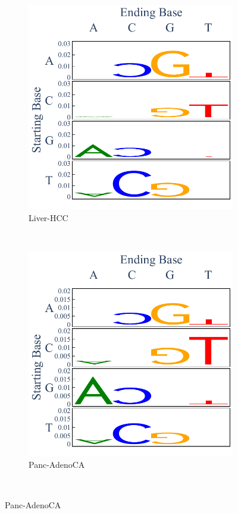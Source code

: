 \begin{figure}[htbp]
    \begin{subfigure}{.5\textwidth}
    \includegraphics[scale=0.7]{graphics/spectra_Liver-HCC.pdf}
    \caption{Liver-HCC}
    \label{fig:spectra_liver}
    \end{subfigure}
    ~
    \begin{subfigure}{.5\textwidth}
    \includegraphics[scale=0.7]{graphics/spectra_Panc-AdenoCA.pdf}
    \caption{Panc-AdenoCA}
    \label{fig:spectra_panc_adenoca}
    \end{subfigure} \\
    

\end{figure}
